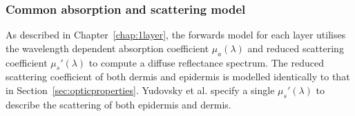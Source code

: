\subsubsection{Common absorption and scattering model}\label{sec:opticproperties2}
As described in Chapter~\ref{chap:1layer}, the forwards model for each layer utilises the wavelength dependent absorption coefficient $\mu_a(\lambda)$ and reduced scattering coefficient $\mu_s'(\lambda)$ to compute a diffuse reflectance spectrum. The reduced scattering coefficient of both dermis and epidermis is modelled identically to that in Section~\ref{sec:opticproperties}.
Yudovsky et al. specify a single $\mu_s'(\lambda)$ to describe the scattering of both epidermis and dermis. 

